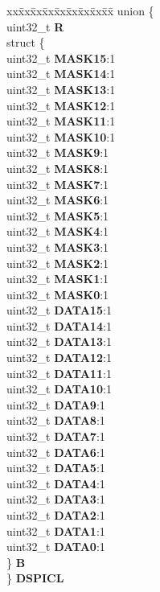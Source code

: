 \begin{DoxyCompactItemize}
\begin{tabbing}
\end{tabbing}\item 
\mbox{\label{structSIU__tag_a7f4aa15977fc115814822c0b19904cf1}} 
\begin{tabbing}
xx\=xx\=xx\=xx\=xx\=xx\=xx\=xx\=xx\=\kill
union \{\\
\>uint32\_t {\bfseries R}\\
\>struct \{\\
\>\>uint32\_t {\bfseries MASK15}:1\\
\>\>uint32\_t {\bfseries MASK14}:1\\
\>\>uint32\_t {\bfseries MASK13}:1\\
\>\>uint32\_t {\bfseries MASK12}:1\\
\>\>uint32\_t {\bfseries MASK11}:1\\
\>\>uint32\_t {\bfseries MASK10}:1\\
\>\>uint32\_t {\bfseries MASK9}:1\\
\>\>uint32\_t {\bfseries MASK8}:1\\
\>\>uint32\_t {\bfseries MASK7}:1\\
\>\>uint32\_t {\bfseries MASK6}:1\\
\>\>uint32\_t {\bfseries MASK5}:1\\
\>\>uint32\_t {\bfseries MASK4}:1\\
\>\>uint32\_t {\bfseries MASK3}:1\\
\>\>uint32\_t {\bfseries MASK2}:1\\
\>\>uint32\_t {\bfseries MASK1}:1\\
\>\>uint32\_t {\bfseries MASK0}:1\\
\>\>uint32\_t {\bfseries DATA15}:1\\
\>\>uint32\_t {\bfseries DATA14}:1\\
\>\>uint32\_t {\bfseries DATA13}:1\\
\>\>uint32\_t {\bfseries DATA12}:1\\
\>\>uint32\_t {\bfseries DATA11}:1\\
\>\>uint32\_t {\bfseries DATA10}:1\\
\>\>uint32\_t {\bfseries DATA9}:1\\
\>\>uint32\_t {\bfseries DATA8}:1\\
\>\>uint32\_t {\bfseries DATA7}:1\\
\>\>uint32\_t {\bfseries DATA6}:1\\
\>\>uint32\_t {\bfseries DATA5}:1\\
\>\>uint32\_t {\bfseries DATA4}:1\\
\>\>uint32\_t {\bfseries DATA3}:1\\
\>\>uint32\_t {\bfseries DATA2}:1\\
\>\>uint32\_t {\bfseries DATA1}:1\\
\>\>uint32\_t {\bfseries DATA0}:1\\
\>\} {\bfseries B}\\
\} {\bfseries DSPICL}\\


\end{tabbing}
\end{DoxyCompactItemize}
